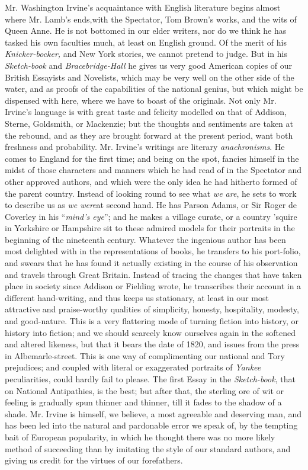 Mr. Washington Irvine's acquaintance with English literature
begins almost where Mr. Lamb's ends,\textemdash with the
Spectator, Tom Brown's works, and the wits of Queen Anne. He is
not bottomed in our elder writers, nor do we think he has tasked
his own faculties much, at least on English ground. Of the merit
of his \emph{Knicker-bocker,} and New York stories, we cannot
pretend to judge. But in his \emph{Sketch-book} and
\emph{Bracebridge-Hall} he gives us very good American copies of
our British Essayists and Novelists, which may be very well on the
other side of the water, and as proofs of the capabilities of the
national genius, but which might be dispensed with here, where we
have to boast of the originals. Not only Mr. Irvine's language is
with great taste and felicity modelled on that of Addison, Sterne,
Goldsmith, or Mackenzie; but the thoughts and sentiments are taken
at the rebound, and as they are brought forward at the present
period, want both freshness and probability. Mr. Irvine's writings
are literary \emph{anachronisms}. He comes to England for the
first time; and being on the spot, fancies himself in the midst of
those characters and manners which he had read of in the Spectator
and other approved authors, and which were the only idea he had
hitherto formed of the parent country. Instead of looking round to
see what \emph{we are}, he sets to work to describe us as \emph{we
  were}\textemdash at second hand. He has Parson Adams, or Sir
Roger de Coverley in his ``\emph{mind's eye}''; and he makes a
village curate, or a country 'squire in Yorkshire or Hampshire sit
to these admired models for their portraits in the beginning of
the nineteenth century. Whatever the ingenious author has been
most delighted with in the representations of books, he transfers
to his port-folio, and swears that he has found it actually
existing in the course of his observation and travels through
Great Britain. Instead of tracing the changes that have taken
place in society since Addison or Fielding wrote, he transcribes
their account in a different hand-writing, and thus keeps us
stationary, at least in our most attractive and praise-worthy
qualities of simplicity, honesty, hospitality, modesty, and
good-nature. This is a very flattering mode of turning fiction
into history, or history into fiction; and we should scarcely know
ourselves again in the softened and altered likeness, but that it
bears the date of 1820, and issues from the press in
Albemarle-street. This is one way of complimenting our national
and Tory prejudices; and coupled with literal or exaggerated
portraits of \emph{Yankee} peculiarities, could hardly fail to
please. The first Essay in the \emph{Sketch-book}, that on
National Antipathies, is the best; but after that, the sterling
ore of wit or feeling is gradually spun thinner and thinner, till
it fades to the shadow of a shade. Mr. Irvine is himself, we
believe, a most agreeable and deserving man, and has been led into
the natural and pardonable error we speak of, by the tempting bait
of European popularity, in which he thought there was no more
likely method of succeeding than by imitating the style of our
standard authors, and giving us credit for the virtues of our
forefathers.

